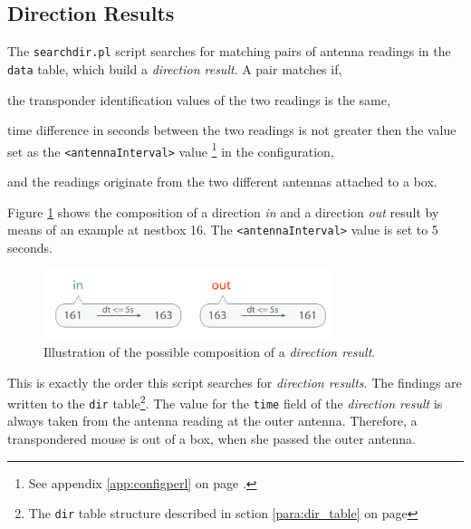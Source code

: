 \subsection{Direction Results}
\label{subsec:dirres}

The \lstinline|searchdir.pl| script searches for matching pairs of antenna readings in the \lstinline|data| table, which build a \textit{direction result}. A pair matches if,

\begin{mylist}
\item the transponder identification values of the two readings is the same,
\item time difference in seconds between the two readings is not greater then the value set as the \lstinline|<antennaInterval>| value \footnote{See appendix \ref{app:configperl} on page \pageref{app:configperl}.} in the configuration, 
\item and the readings originate from the two different antennas attached to a box.  
\end{mylist}

Figure \ref{fig:direction_result} shows the composition of a direction \textit{in} and a direction \textit{out} result by means of an example at nestbox 16. The \lstinline|<antennaInterval>| value is set to 5 seconds.  

\begin{figure}[htpb]
\begin{center}
  \includegraphics[width=0.75\textwidth]{assets/pdf/direction_result_schema.pdf}
  \caption[Illustration of direction result]{Illustration of the possible composition of a \textit{direction result}.}
  \label{fig:direction_result}
\end{center}
\end{figure}

This is exactly the order this script searches for \textit{direction results}. The findings are written to the \lstinline|dir| table\footnote{The \lstinline|dir| table structure described in sction \ref{para:dir_table} on page \pageref{para:dir_table}}. The value for the \lstinline|time| field of the \textit{direction result} is always taken from the antenna reading at the outer antenna. Therefore, a transpondered mouse is out of a box, when she passed the outer antenna. 

